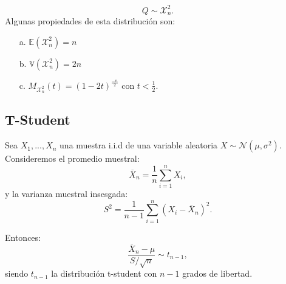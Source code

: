 \[Q\sim\mathcal{X}^2_n. \]
Algunas propiedades de esta distribución son:
\begin{enumerate}
    \item [a.] $\mathbb{E}(\mathcal{X}^2_n) = n$
    \item [b.] $\mathbb{V}(\mathcal{X}^2_n) = 2n$
    \item [c.] $M_{\mathcal{X}^2_n}(t) = (1-2t)^{\frac{-n}{2}}$ con $t<\frac{1}{2}$.
    
\end{enumerate}

\subsection{T-Student}

Sea $X_1,...,X_n$ una muestra i.i.d de una variable aleatoria $X\sim\mathcal{N}(\mu,\sigma^2)$. Consideremos el promedio muestral:
\[\overline{X}_n=\dfrac{1}{n}\sum\limits_{i=1}^n X_i,\]
y la varianza muestral insesgada:
\[S^2=\dfrac{1}{n-1}\sum\limits_{i=1}^n (X_i-\overline{X}_n)^2.\]

Entonces:
\[\dfrac{\overline{X}_n-\mu}{S/\sqrt{n}}\sim t_{n-1},\]
siendo $t_{n-1}$ la distribución t-student con $n-1$ grados de libertad.